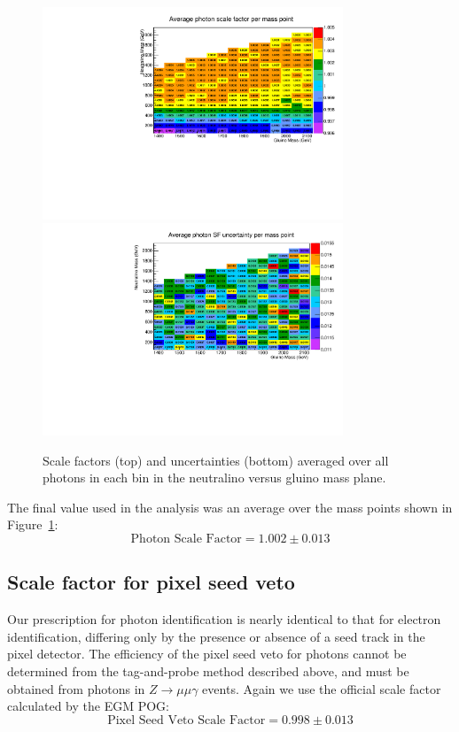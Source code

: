 \begin{figure}[htbp]
    \centering
    \includegraphics[width=0.8\textwidth]{Figures/EventSelect/sfmap.pdf}
    \includegraphics[width=0.8\textwidth]{Figures/EventSelect/sfmap_errors.pdf}
    \caption{Scale factors (top) and uncertainties (bottom)
      averaged over all photons in each bin in the neutralino
      versus gluino mass plane.}
    \label{fig:SFmap}
\end{figure}

The final value used in the analysis was an average over the mass
points shown in Figure~\ref{fig:SFmap}:
\begin{equation}
  \textrm{Photon Scale Factor} = 1.002\pm0.013
\end{equation}

\subsection{Scale factor for pixel seed veto}
\label{sec:PSV_SF}
Our prescription for photon identification is nearly identical to that for
electron identification, differing only by the presence or absence of a seed
track in the pixel detector. The efficiency of the pixel seed veto
for photons cannot be determined from the tag-and-probe method described above,
and must be obtained from photons in $Z\rightarrow \mu\mu\gamma$
events. Again we use the official scale factor calculated by the
EGM POG:
\begin{equation}
  \textrm{Pixel Seed Veto Scale Factor} = 0.998\pm0.013
\end{equation}

